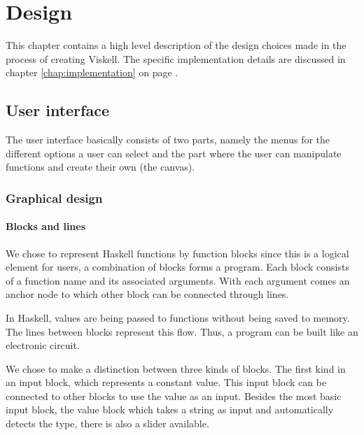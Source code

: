 \chapter{Design}

This chapter contains a high level description of the design choices made in the process of creating Viskell.
The specific implementation details are discussed in chapter \ref{chap:implementation} on page \pageref{chap:implementation}.

\section{User interface}

The user interface basically consists of two parts, namely the menus for the different options a user can select and the part where the user can manipulate functions and create their own (the canvas).

\subsection{Graphical design}

\subsubsection{Blocks and lines}

We chose to represent Haskell functions by function blocks since this is a logical element for users, a combination of blocks forms a program.
Each block consists of a function name and its associated arguments. With each argument comes an anchor node to which other block can be connected through lines.

In Haskell, values are being passed to functions without being saved to memory.
The lines between blocks represent this flow.
Thus, a program can be built like an electronic circuit.

We chose to make a distinction between three kinds of blocks.
The first kind in an input block, which represents a constant value.
This input block can be connected to other blocks to use the value as an input.
Besides the most basic input block, the value block which takes a string as input and automatically detects the type, there is also a slider available.

